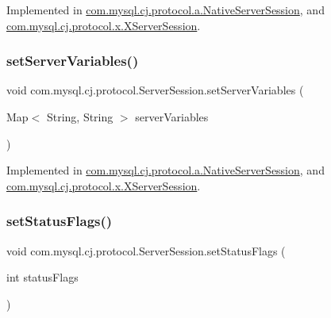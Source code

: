 Implemented in \mbox{\hyperlink{classcom_1_1mysql_1_1cj_1_1protocol_1_1a_1_1_native_server_session_a404e7d990dbe62a81e702565dd55c8b5}{com.\+mysql.\+cj.\+protocol.\+a.\+Native\+Server\+Session}}, and \mbox{\hyperlink{classcom_1_1mysql_1_1cj_1_1protocol_1_1x_1_1_x_server_session_af6cfe7212e12090456729683e3ba9bdb}{com.\+mysql.\+cj.\+protocol.\+x.\+X\+Server\+Session}}.

\mbox{\label{interfacecom_1_1mysql_1_1cj_1_1protocol_1_1_server_session_a47e9a273ef6de1e09dbacada62650998}} 
\subsubsection{\texorpdfstring{set\+Server\+Variables()}{setServerVariables()}}
{\footnotesize\ttfamily void com.\+mysql.\+cj.\+protocol.\+Server\+Session.\+set\+Server\+Variables (\begin{DoxyParamCaption}\item[{Map$<$ String, String $>$}]{server\+Variables }\end{DoxyParamCaption})}



Implemented in \mbox{\hyperlink{classcom_1_1mysql_1_1cj_1_1protocol_1_1a_1_1_native_server_session_a5075caf877a67ffac4ab458c54f56071}{com.\+mysql.\+cj.\+protocol.\+a.\+Native\+Server\+Session}}, and \mbox{\hyperlink{classcom_1_1mysql_1_1cj_1_1protocol_1_1x_1_1_x_server_session_affb18fb89e4799f066674d120f2c9088}{com.\+mysql.\+cj.\+protocol.\+x.\+X\+Server\+Session}}.

\mbox{\label{interfacecom_1_1mysql_1_1cj_1_1protocol_1_1_server_session_a855cbd715a8c33299d062a72fd75d8f4}} 
\subsubsection{\texorpdfstring{set\+Status\+Flags()}{setStatusFlags()}\hspace{0.1cm}{\footnotesize\ttfamily [1/2]}}
{\footnotesize\ttfamily void com.\+mysql.\+cj.\+protocol.\+Server\+Session.\+set\+Status\+Flags (\begin{DoxyParamCaption}\item[{int}]{status\+Flags }\end{DoxyParamCaption})}

